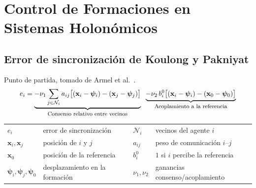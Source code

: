 \section{Control de Formaciones en Sistemas Holonómicos}
\subsection{Error de sincronización de Koulong y Pakniyat}
Punto de partida, tomado de Armel et al.~\cite{koulong2024distributed}.
\begin{equation*}
    e_i =
    \underbrace{-\nu_1 \sum_{j \in \mathcal{N}_i} a_{ij}\big[(\mathbf{x}_i-\boldsymbol{\psi}_i)-(\mathbf{x}_j-\boldsymbol{\psi}_j)\big]}_{\text{\footnotesize Consenso relativo entre vecinos}}
    \;\;
    \underbrace{-\nu_2\, b_i^0\big[(\mathbf{x}_i-\boldsymbol{\psi}_i)-(\mathbf{x}_0-\boldsymbol{\psi}_0)\big]}_{\text{\footnotesize Acoplamiento a la referencia}}
\end{equation*}

{\footnotesize
\noindent
\begin{tabular}{l@{\ }l@{\qquad}l@{\ }l}
$e_i$ & error de sincronización & $\mathcal{N}_i$ & vecinos del agente $i$ \\
$\mathbf{x}_i,\mathbf{x}_j$ & posición de $i$ y $j$ & $a_{ij}$ & peso de comunicación $i$--$j$ \\
$\mathbf{x}_0$ & posición de la referencia & $b_i^0$ & $1$ si $i$ percibe la referencia \\
$\boldsymbol{\psi}_i,\boldsymbol{\psi}_j,\boldsymbol{\psi}_0$ & desplazamiento en la formación & $\nu_1,\nu_2$ & ganancias consenso/acoplamiento \\
\end{tabular}
}

